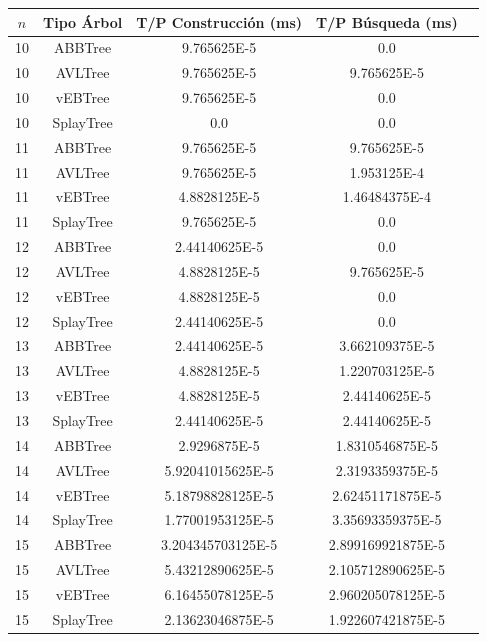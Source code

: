 \documentclass[letterpaper,12pt]{article}
\begin{document}
\begin{tabular}{|c|c|c|c|c|}
\hline
\textbf{$n$} & \textbf{Tipo Árbol} & \textbf{T/P Construcción (ms)} & \textbf{T/P Búsqueda (ms)} \\
\hline
10 & ABBTree & 9.765625E-5 & 0.0 \\
\hline
10 & AVLTree & 9.765625E-5 & 9.765625E-5 \\
\hline
10 & vEBTree & 9.765625E-5 & 0.0\\
\hline
10 & SplayTree & 0.0 & 0.0 \\
\hline
\hline
11 & ABBTree & 9.765625E-5 & 9.765625E-5 \\
\hline
11 & AVLTree & 9.765625E-5 & 1.953125E-4 \\
\hline
11 & vEBTree & 4.8828125E-5 & 1.46484375E-4\\
\hline
11 & SplayTree & 9.765625E-5 & 0.0 \\
\hline
\hline
12 & ABBTree & 2.44140625E-5 & 0.0  \\
\hline
12 & AVLTree & 4.8828125E-5 & 9.765625E-5 \\
\hline
12 & vEBTree & 4.8828125E-5 & 0.0\\
\hline
12 & SplayTree & 2.44140625E-5 & 0.0 \\
\hline
\hline
13 & ABBTree & 2.44140625E-5 & 3.662109375E-5  \\
\hline
13 & AVLTree & 4.8828125E-5 & 1.220703125E-5 \\
\hline
13 & vEBTree & 4.8828125E-5 & 2.44140625E-5\\
\hline
13 & SplayTree & 2.44140625E-5 & 2.44140625E-5 \\
\hline
\hline
14 & ABBTree & 2.9296875E-5 & 1.8310546875E-5 \\
\hline
14 & AVLTree & 5.92041015625E-5 & 2.3193359375E-5 \\
\hline
14 & vEBTree & 5.18798828125E-5 & 2.62451171875E-5\\
\hline
14 & SplayTree & 1.77001953125E-5 & 3.35693359375E-5 \\
\hline
\hline
15 & ABBTree & 3.204345703125E-5 & 2.899169921875E-5 \\
\hline
15 & AVLTree & 5.43212890625E-5 & 2.105712890625E-5 \\
\hline
15 & vEBTree & 6.16455078125E-5  & 2.960205078125E-5\\
\hline
15 & SplayTree & 2.13623046875E-5 & 1.922607421875E-5 \\
\hline
\end{tabular}
\end{document}
